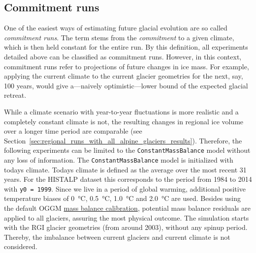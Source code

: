 
    \subsection{Commitment runs} %
    \label{sub:commitment_runs_setup}
        One of the easiest ways of estimating future glacial evolution are so called \textit{commitment runs}.
        The term stems from the \textit{commitment} to a given climate, which is then held constant for the entire run. By this definition, all experiments detailed above can be classified as commitment runs. However, in this context, commitment runs refer to projections of future changes in ice mass. For example, applying the current climate to the current glacier geometries for the next, say, 100 years, would give a---naively optimistic---lower bound of the expected glacial retreat.

        While a climate scenario with year-to-year fluctuations is more realistic and a completely constant climate is not, the resulting changes in regional ice volume over a longer time period are comparable (see Section~\ref{sec:regional_runs_with_all_alpine_glaciers_results}). Therefore, the following experiments can be limited to the \lstinline`ConstantMassBalance` model without any loss of information. The \lstinline`ConstantMassBalance` model is initialized with todays climate. Todays climate is defined as the average over the most recent 31 years. For the HISTALP dataset this corresponds to the period from 1984 to 2014 with \lstinline`y0 = 1999`. Since we live in a period of global warming, additional positive temperature biases of \SI{0}{\celsius}, \SI{+0.5}{\celsius}, \SI{+1.0}{\celsius} and \SI{+2.0}{\celsius} are used. Besides using the default OGGM \hyperref[ssub:mb_calib]{mass balance calibration}, potential mass balance residuals \bias{} are applied to all glaciers, assuring the most physical outcome. The simulation starts with the RGI glacier geometries (from around 2003), without any spinup period. Thereby, the imbalance between current glaciers and current climate is not considered.
    

